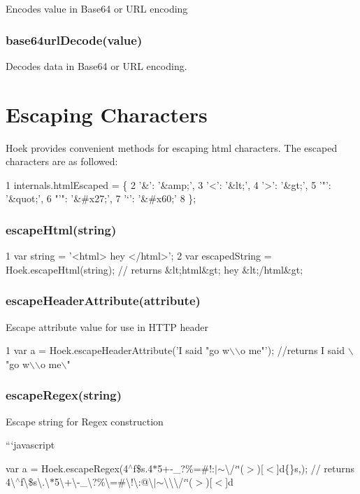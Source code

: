 Encodes value in Base64 or U\+R\+L encoding

\subsubsection*{base64url\+Decode(value)}

Decodes data in Base64 or U\+R\+L encoding. \section*{Escaping Characters}

Hoek provides convenient methods for escaping html characters. The escaped characters are as followed\+:


\begin{DoxyCode}
1 internals.htmlEscaped = \{
2     '&': '&amp;',
3     '<': '&lt;',
4     '>': '&gt;',
5     '"': '&quot;',
6     "'": '&#x27;',
7     '`': '&#x60;'
8 \};
\end{DoxyCode}


\subsubsection*{escape\+Html(string)}


\begin{DoxyCode}
1 var string = '<html> hey </html>';
2 var escapedString = Hoek.escapeHtml(string); // returns &lt;html&gt; hey &lt;/html&gt;
\end{DoxyCode}


\subsubsection*{escape\+Header\+Attribute(attribute)}

Escape attribute value for use in H\+T\+T\+P header


\begin{DoxyCode}
1 var a = Hoek.escapeHeaderAttribute('I said "go w\(\backslash\)\(\backslash\)o me"');  //returns I said \(\backslash\)"go w\(\backslash\)\(\backslash\)o me\(\backslash\)"
\end{DoxyCode}


\subsubsection*{escape\+Regex(string)}

Escape string for Regex construction

```javascript

var a = Hoek.\+escape\+Regex(\textquotesingle{}4$^\wedge$f\$s.4$\ast$5+-\/\+\_\+?\%=\#!\+:$|$$\sim$\textbackslash{}/`\char`\"{}($>$)\mbox{[}$<$\mbox{]}d\{\}s,\textquotesingle{});  // returns 4\textbackslash{}$^\wedge$f\textbackslash{}\$s\textbackslash{}.\textbackslash{}$\ast$5\textbackslash{}+\textbackslash{}-\/\+\_\+\textbackslash{}?\%\textbackslash{}=\#\textbackslash{}!\textbackslash{}\+:@\textbackslash{}$\vert$$\sim$\textbackslash{}\textbackslash{}\textbackslash{}/`\char`\"{}($>$)\mbox{[}$<$\mbox{]}d 